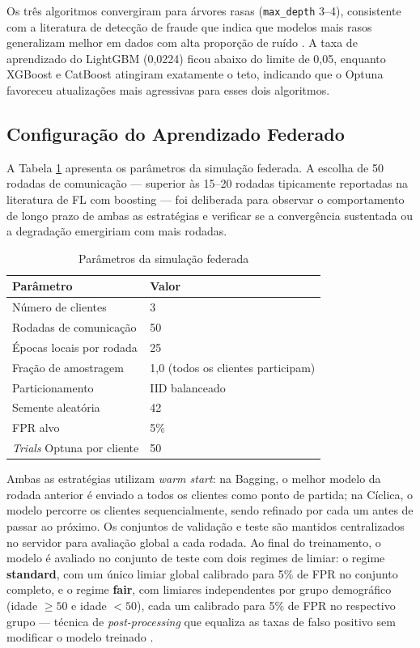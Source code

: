 Os três algoritmos convergiram para árvores rasas (\texttt{max\_depth} 3--4), consistente com a literatura de detecção de fraude que indica que modelos mais rasos generalizam melhor em dados com alta proporção de ruído \cite{pozzolo2015calibrating}. A taxa de aprendizado do LightGBM (0,0224) ficou abaixo do limite de 0,05, enquanto XGBoost e CatBoost atingiram exatamente o teto, indicando que o Optuna favoreceu atualizações mais agressivas para esses dois algoritmos.

\subsection{Configuração do Aprendizado Federado}

A Tabela \ref{tab:fl_config} apresenta os parâmetros da simulação federada. A escolha de 50 rodadas de comunicação --- superior às 15--20 rodadas tipicamente reportadas na literatura de FL com boosting \cite{li2020practical,liu2024survey} --- foi deliberada para observar o comportamento de longo prazo de ambas as estratégias e verificar se a convergência sustentada ou a degradação emergiriam com mais rodadas.

\begin{table}[H]
\centering
\begin{tabularx}{\textwidth}{|l|X|}
\hline
\bf Parâmetro & \bf Valor \\ \hline
Número de clientes & 3 \\ \hline
Rodadas de comunicação & 50 \\ \hline
Épocas locais por rodada & 25 \\ \hline
Fração de amostragem & 1,0 (todos os clientes participam) \\ \hline
Particionamento & IID balanceado \\ \hline
Semente aleatória & 42 \\ \hline
FPR alvo & 5\% \\ \hline
\textit{Trials} Optuna por cliente & 50 \\ \hline
\end{tabularx}
\caption{Parâmetros da simulação federada}
\label{tab:fl_config}
\end{table}

Ambas as estratégias utilizam \textit{warm start}: na Bagging, o melhor modelo da rodada anterior é enviado a todos os clientes como ponto de partida; na Cíclica, o modelo percorre os clientes sequencialmente, sendo refinado por cada um antes de passar ao próximo. Os conjuntos de validação e teste são mantidos centralizados no servidor para avaliação global a cada rodada. Ao final do treinamento, o modelo é avaliado no conjunto de teste com dois regimes de limiar: o regime \textbf{standard}, com um único limiar global calibrado para 5\% de FPR no conjunto completo, e o regime \textbf{fair}, com limiares independentes por grupo demográfico (idade $\geq 50$ e idade $< 50$), cada um calibrado para 5\% de FPR no respectivo grupo --- técnica de \textit{post-processing} que equaliza as taxas de falso positivo sem modificar o modelo treinado \cite{hardt2016equality}.

